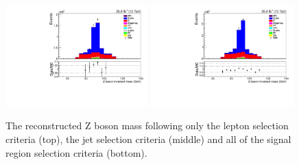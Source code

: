 \begin{figure}[ht]
\includegraphics[width=0.49\textwidth]{figs/background-estimation/plots/unblinded/prompt_ee_ttbarInc/zPairMass_NPL_ee_wMass_ee.pdf}
\includegraphics[width=0.49\textwidth]{figs/background-estimation/plots/unblinded/prompt_mumu_ttbarInc/zPairMass_NPL_mumu_wMass_mumu.pdf}
\caption{
The reconstructed Z boson mass following only the lepton selection criteria (top), the jet selection criteria (middle) and all of the signal region selection criteria (bottom).
}
\label{fig:SR_zBosonMass}
\end{figure}

